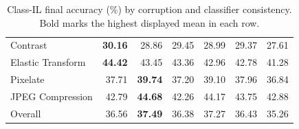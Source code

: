\documentclass[10pt,twocolumn,letterpaper]{article}
\begin{document}
\begin{table}[h]
\begin{tabular}{lrrrrrr}
            Contrast & \textbf{30.16} & 28.86 & 29.45 & 28.99 & 29.37 & 27.61 \\
            Elastic Transform & \textbf{44.42} & 43.45 & 43.36 & 42.96 & 42.78 & 41.28 \\
            Pixelate & 37.71 & \textbf{39.74} & 37.20 & 39.10 & 37.96 & 36.84 \\
            JPEG Compression & 42.79 & \textbf{44.68} & 42.26 & 44.17 & 43.75 & 42.88 \\
            \midrule
            Overall & 36.56 & \textbf{37.49} & 36.38 & 37.27 & 36.43 & 35.26 \\
            \bottomrule\end{tabular}
      \caption{Class-IL final accuracy (\%) by corruption and classifier consistency. Bold marks the highest displayed mean in each row.}\label{tab:class-detail}\end{table}
\end{document}
